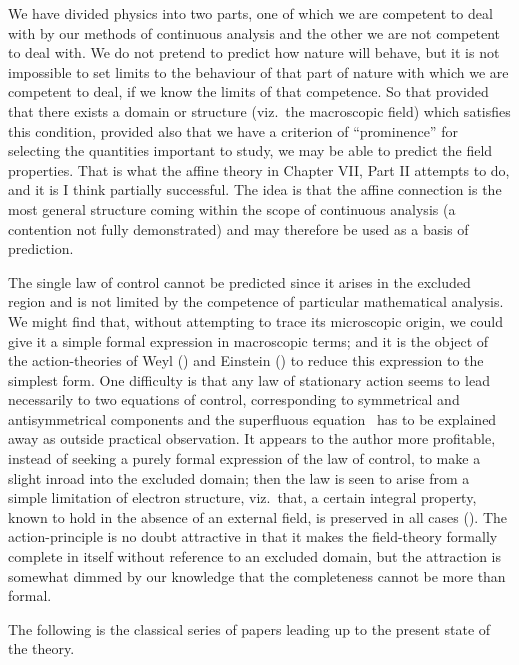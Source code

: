 \documentclass[12pt]{book}
\begin{document}
We have divided physics into two parts, one of which we are competent to deal with by our methods of continuous
analysis and the other we are not competent to deal with.
We do not pretend to predict  how nature will behave, but it is not impossible to set limits
to the behaviour of that part of nature with which we are competent to deal, if we know the limits of that competence.
So that provided that there exists a domain or structure (viz.\ the macroscopic field) which satisfies this condition,
provided also that we have a criterion of ``prominence'' for selecting the quantities important to study,
we may be able to predict the field properties.
That is what the affine theory in Chapter VII, Part II attempts to do, and it is I think partially successful.
The idea is that the affine connection is the most general structure coming within the scope of continuous analysis
(a contention not fully demonstrated) and may therefore be used as a basis of prediction.

The single law of control cannot be predicted  since it arises in the excluded region and is not
limited by the competence of particular mathematical analysis.
We might find that, without attempting to trace its microscopic origin, we could give it a simple formal expression
in macroscopic terms; and it is the object of the action-theories of Weyl () and Einstein ()
to reduce this expression to the simplest form.
One difficulty is that any law of stationary action seems to lead necessarily to two equations of control,
corresponding to symmetrical and antisymmetrical components and the superfluous equation~
has to be explained away as outside practical observation.
It appears to the author more profitable, instead of seeking a purely formal expression of the law of control,
to make a slight inroad into the excluded domain; then the law is seen to arise from a simple limitation of electron
structure, viz.\ that, a certain integral property, known to hold in the absence of an external field, is preserved
in all cases ().
The action-principle is no doubt attractive in that it makes the field-theory formally complete in itself without
reference to an excluded domain, but the attraction is somewhat dimmed by our knowledge that the completeness cannot
be more than formal.


The following is the classical series of papers leading up to the present state of the theory.
\end{document}
